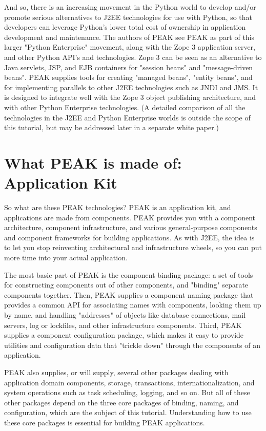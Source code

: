 And so, there is an increasing movement in the Python world to develop
and/or promote serious alternatives to J2EE technologies for use with
Python, so that developers can leverage Python's lower total cost of
ownership in application development and maintenance. The authors of
PEAK see PEAK as part of this larger "Python Enterprise" movement, along
with the Zope 3 application server, and other Python API's and
technologies. Zope 3 can be seen as an alternative to Java servlets,
JSP, and EJB containers for "session beans" and "message-driven beans".
PEAK supplies tools for creating "managed beans", "entity beans", and
for implementing parallels to other J2EE technologies such as JNDI and
JMS. It is designed to integrate well with the Zope 3 object publishing
architecture, and with other Python Enterprise technologies. (A detailed
comparison of all the technologies in the J2EE and Python Enterprise
worlds is outside the scope of this tutorial, but may be addressed later
in a separate white paper.) 


\section{What PEAK is made of: Application Kit} 

So what are these PEAK technologies? PEAK is an application kit, and
applications are made from components. PEAK provides you with a
component architecture, component infrastructure, and various
general-purpose components and component frameworks for building
applications. As with J2EE, the idea is to let you stop reinventing
architectural and infrastructure wheels, so you can put more time into
your actual application. 

The most basic part of PEAK is the component binding package: a set of
tools for constructing components out of other components, and "binding"
separate components together. Then, PEAK supplies a component naming
package that provides a common API for associating names with
components, looking them up by name, and handling "addresses" of objects
like database connections, mail servers, log or lockfiles, and other
infrastructure components. Third, PEAK supplies a component
configuration package, which makes it easy to provide utilities and
configuration data that "trickle down" through the components of an
application. 

PEAK also supplies, or will supply, several other packages dealing with
application domain components, storage, transactions,
internationalization, and system operations such as task scheduling,
logging, and so on. But all of these other packages depend on the three
core packages of binding, naming, and configuration, which are the
subject of this tutorial. Understanding how to use these core packages
is essential for building PEAK applications. 

